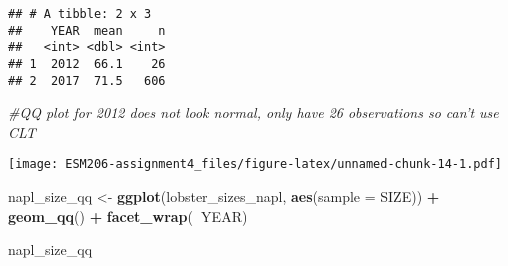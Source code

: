 \documentclass[]{article}
\newenvironment{Shaded}{\begin{snugshade}}{\end{snugshade}}
\newcommand{\KeywordTok}[1]{\textcolor[rgb]{0.13,0.29,0.53}{\textbf{#1}}}
\newcommand{\DataTypeTok}[1]{\textcolor[rgb]{0.13,0.29,0.53}{#1}}
\newcommand{\DecValTok}[1]{\textcolor[rgb]{0.00,0.00,0.81}{#1}}
\newcommand{\StringTok}[1]{\textcolor[rgb]{0.31,0.60,0.02}{#1}}
\newcommand{\CommentTok}[1]{\textcolor[rgb]{0.56,0.35,0.01}{\textit{#1}}}
\newcommand{\OperatorTok}[1]{\textcolor[rgb]{0.81,0.36,0.00}{\textbf{#1}}}
\newcommand{\NormalTok}[1]{#1}
\begin{document}
\begin{verbatim}
## # A tibble: 2 x 3
##    YEAR  mean     n
##   <int> <dbl> <int>
## 1  2012  66.1    26
## 2  2017  71.5   606
\end{verbatim}

\begin{Shaded}
\begin{Highlighting}[]
\CommentTok{#QQ plot for 2012 does not look normal, only have 26 observations so can't use CLT}
\end{Highlighting}
\end{Shaded}

\begin{Shaded}
\end{Shaded}

\texttt{[image: ESM206-assignment4\_files/figure-latex/unnamed-chunk-14-1.pdf]}

\begin{Shaded}
\begin{Highlighting}[]
\NormalTok{napl_size_qq <-}\StringTok{ }\KeywordTok{ggplot}\NormalTok{(lobster_sizes_napl, }\KeywordTok{aes}\NormalTok{(}\DataTypeTok{sample =}\NormalTok{ SIZE)) }\OperatorTok{+}
\StringTok{  }\KeywordTok{geom_qq}\NormalTok{() }\OperatorTok{+}
\StringTok{  }\KeywordTok{facet_wrap}\NormalTok{(}\OperatorTok{~}\NormalTok{YEAR)}

\NormalTok{napl_size_qq}
\end{Highlighting}
\end{Shaded}
\end{document}
